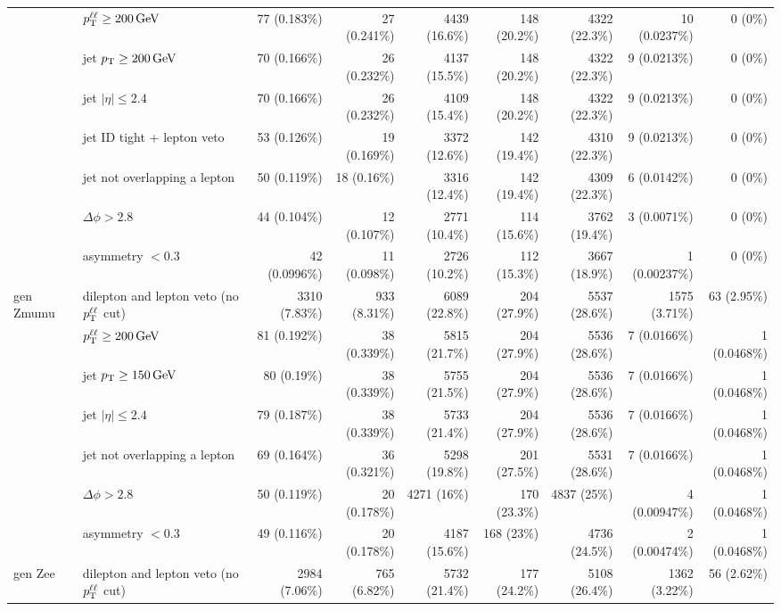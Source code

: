 \begin{tabular}{llrrrrrrr}
 & $p_{\mathrm{T}}^{\ell\ell} \geq 200\,\mathrm{GeV}$ & 77 (0.183\%) & 27 (0.241\%) & 4439 (16.6\%) & 148 (20.2\%) & 4322 (22.3\%) & 10 (0.0237\%) & 0 (0\%) \\
 & jet $p_{\mathrm{T}} \geq 200\,\mathrm{GeV}$ & 70 (0.166\%) & 26 (0.232\%) & 4137 (15.5\%) & 148 (20.2\%) & 4322 (22.3\%) & 9 (0.0213\%) & 0 (0\%) \\
 & jet $|\eta| \leq 2.4$ & 70 (0.166\%) & 26 (0.232\%) & 4109 (15.4\%) & 148 (20.2\%) & 4322 (22.3\%) & 9 (0.0213\%) & 0 (0\%) \\
 & jet ID tight + lepton veto & 53 (0.126\%) & 19 (0.169\%) & 3372 (12.6\%) & 142 (19.4\%) & 4310 (22.3\%) & 9 (0.0213\%) & 0 (0\%) \\
 & jet not overlapping a lepton & 50 (0.119\%) & 18 (0.16\%) & 3316 (12.4\%) & 142 (19.4\%) & 4309 (22.3\%) & 6 (0.0142\%) & 0 (0\%) \\
 & $\Delta\phi > 2.8$ & 44 (0.104\%) & 12 (0.107\%) & 2771 (10.4\%) & 114 (15.6\%) & 3762 (19.4\%) & 3 (0.0071\%) & 0 (0\%) \\
 & asymmetry $< 0.3$ & 42 (0.0996\%) & 11 (0.098\%) & 2726 (10.2\%) & 112 (15.3\%) & 3667 (18.9\%) & 1 (0.00237\%) & 0 (0\%) \\
\midrule
gen Zmumu & dilepton and lepton veto (no $p_{\mathrm{T}}^{\ell\ell}$ cut) & 3310 (7.83\%) & 933 (8.31\%) & 6089 (22.8\%) & 204 (27.9\%) & 5537 (28.6\%) & 1575 (3.71\%) & 63 (2.95\%) \\
 & $p_{\mathrm{T}}^{\ell\ell} \geq 200\,\mathrm{GeV}$ & 81 (0.192\%) & 38 (0.339\%) & 5815 (21.7\%) & 204 (27.9\%) & 5536 (28.6\%) & 7 (0.0166\%) & 1 (0.0468\%) \\
 & jet $p_{\mathrm{T}} \geq 150\,\mathrm{GeV}$ & 80 (0.19\%) & 38 (0.339\%) & 5755 (21.5\%) & 204 (27.9\%) & 5536 (28.6\%) & 7 (0.0166\%) & 1 (0.0468\%) \\
 & jet $|\eta| \leq 2.4$ & 79 (0.187\%) & 38 (0.339\%) & 5733 (21.4\%) & 204 (27.9\%) & 5536 (28.6\%) & 7 (0.0166\%) & 1 (0.0468\%) \\
 & jet not overlapping a lepton & 69 (0.164\%) & 36 (0.321\%) & 5298 (19.8\%) & 201 (27.5\%) & 5531 (28.6\%) & 7 (0.0166\%) & 1 (0.0468\%) \\
 & $\Delta\phi > 2.8$ & 50 (0.119\%) & 20 (0.178\%) & 4271 (16\%) & 170 (23.3\%) & 4837 (25\%) & 4 (0.00947\%) & 1 (0.0468\%) \\
 & asymmetry $< 0.3$ & 49 (0.116\%) & 20 (0.178\%) & 4187 (15.6\%) & 168 (23\%) & 4736 (24.5\%) & 2 (0.00474\%) & 1 (0.0468\%) \\
\midrule
gen Zee & dilepton and lepton veto (no $p_{\mathrm{T}}^{\ell\ell}$ cut) & 2984 (7.06\%) & 765 (6.82\%) & 5732 (21.4\%) & 177 (24.2\%) & 5108 (26.4\%) & 1362 (3.22\%) & 56 (2.62\%) \\

\end{tabular}

